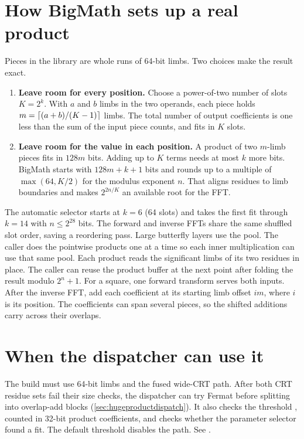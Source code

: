 \newpage
\section{How BigMath sets up a real product}
\label{sec:fermatparams}

Pieces in the library are whole runs of 64-bit limbs. Two choices make
the result exact.

\begin{enumerate}
  \item \textbf{Leave room for every position.} Choose a power-of-two number
        of slots $K=2^k$. With $a$ and $b$ limbs in the two operands, each
        piece holds $m=\left\lceil (a+b)/(K-1) \right\rceil$ limbs. The total number of output
        coefficients is one less than the sum of the input piece counts,
        and fits in $K$ slots.
  \item \textbf{Leave room for the value in each position.} A product of two
        $m$-limb pieces fits in $128m$ bits. Adding up to $K$ terms needs at
        most $k$ more bits. BigMath starts with $128m+k+1$ bits and rounds up
        to a multiple of $\max(64,K/2)$ for the modulus exponent $n$.
        That aligns residues to limb boundaries and makes $2^{2n/K}$ an
        available root for the FFT.
\end{enumerate}

The automatic selector starts at $k=6$ (64 slots) and takes the first fit
through $k=14$ with $n\le2^{28}$ bits. The forward and inverse FFTs share
the same shuffled slot order, saving a reordering pass. Large butterfly
layers use the pool. The caller does the pointwise products one at a time
so each inner multiplication can use that same pool. Each product reads the
significant limbs of its two residues in place. The caller can reuse the product
buffer at the next point after folding the result modulo $2^n+1$. For a square,
one forward transform serves both inputs. After the inverse FFT, add each
coefficient at its starting limb offset $im$, where $i$ is its position.
The coefficients can span several pieces, so the shifted additions
carry across their overlaps.

\section{When the dispatcher can use it}
\label{sec:fermatdispatch}

The build must use 64-bit limbs and the fused wide-CRT path. After both
CRT residue sets fail their size checks, the dispatcher
can try Fermat before splitting into overlap-add blocks
(\cref{sec:hugeproductdispatch}). It also checks the threshold
, counted in 32-bit product
coefficients, and checks whether the parameter selector found a fit.
The default threshold disables the path. See .

